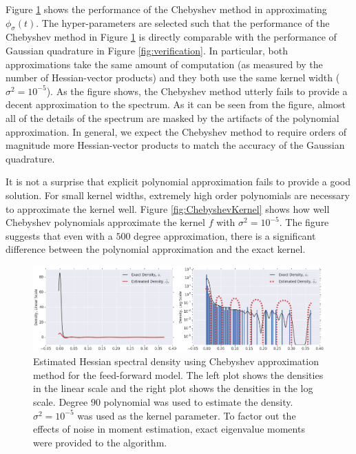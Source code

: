 \documentclass{article}
\newcommand{\phis}{\phi_{\sigma}}
\begin{document}
Figure \ref{fig:Chebyshev} shows the performance of the Chebyshev method in approximating $\phis(t)$. The hyper-parameters are selected such that the performance of the Chebyshev method in Figure \ref{fig:Chebyshev} is directly comparable with the performance of Gaussian quadrature in Figure \ref{fig:verification}. In particular, both approximations take the same amount of computation (as measured by the number of Hessian-vector products) and they both use the same kernel width ($\sigma^2 = 10^{-5}$). As the figure shows, the Chebyshev method utterly fails to provide a decent approximation to the spectrum. As it can be seen from the figure, almost all of the details of the spectrum are masked by the artifacts of the polynomial approximation. In general, we expect the Chebyshev method to require orders of magnitude more Hessian-vector products to match the accuracy of the Gaussian quadrature.

It is not a surprise that explicit polynomial approximation fails to provide a good solution. For small kernel widths, extremely high order polynomials are necessary to approximate the kernel well. Figure \ref{fig:ChebyshevKernel} shows how well Chebyshev polynomials approximate the kernel $f$ with $\sigma^2 = 10^{-5}$. The figure suggests that even with a $500$ degree approximation, there is a significant difference between the polynomial approximation and the exact kernel.  

\begin{figure}[h]
\includegraphics[width=\textwidth]{Chebyshev.png}
\vspace{-0.5cm}
\caption{Estimated Hessian spectral density using Chebyshev approximation method for the feed-forward model. The left plot shows the densities in the linear scale and the right plot shows the densities in the log scale. Degree $90$ polynomial was used to estimate the density. $\sigma^2 = 10^{-5}$ was used as the kernel parameter. To factor out the effects of noise in moment estimation, exact eigenvalue moments were provided to the algorithm. \label{fig:Chebyshev}}
\end{figure}
\end{document}
